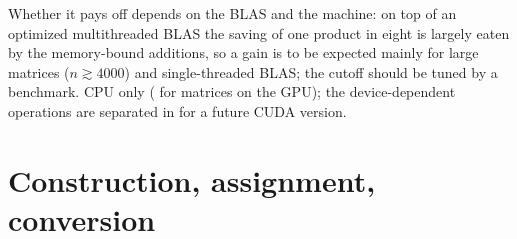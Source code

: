 Whether it pays off depends on the BLAS and the machine: on top of an optimized multithreaded BLAS the saving of one product in eight
is largely eaten by the memory-bound additions, so a gain is to be expected mainly for large matrices ($n\gtrsim4000$) and single-threaded
BLAS; the cutoff should be tuned by a benchmark. CPU only ( for matrices on the GPU); the device-dependent operations
are separated in  for a future CUDA version.

\section{Construction, assignment, conversion}\label{sec:mat:constr}
